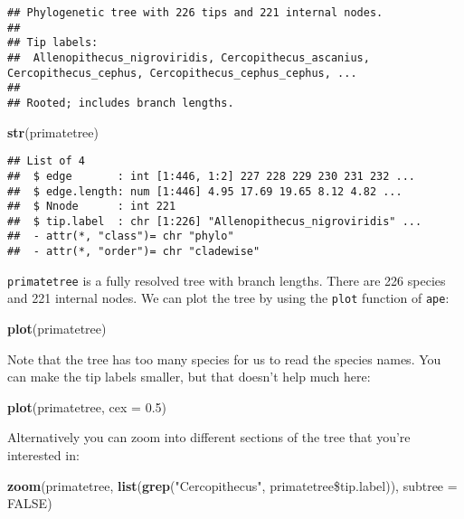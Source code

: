 \documentclass[11pt]{article}
\newcommand{\KeywordTok}[1]{\textcolor[rgb]{0.13,0.29,0.53}{\textbf{{#1}}}}
\newcommand{\DataTypeTok}[1]{\textcolor[rgb]{0.13,0.29,0.53}{{#1}}}
\newcommand{\FloatTok}[1]{\textcolor[rgb]{0.00,0.00,0.81}{{#1}}}
\newcommand{\StringTok}[1]{\textcolor[rgb]{0.31,0.60,0.02}{{#1}}}
\newcommand{\OtherTok}[1]{\textcolor[rgb]{0.56,0.35,0.01}{{#1}}}
\newcommand{\NormalTok}[1]{{#1}}
\begin{document}
\begin{verbatim}
## Phylogenetic tree with 226 tips and 221 internal nodes.
## 
## Tip labels:
##  Allenopithecus_nigroviridis, Cercopithecus_ascanius, 
Cercopithecus_cephus, Cercopithecus_cephus_cephus, ...
## 
## Rooted; includes branch lengths.
\end{verbatim}

\begin{snugshade}
\begin{Highlighting}[]
\KeywordTok{str}\NormalTok{(primatetree)}
\end{Highlighting}
\end{snugshade}

\begin{verbatim}
## List of 4
##  $ edge       : int [1:446, 1:2] 227 228 229 230 231 232 ...
##  $ edge.length: num [1:446] 4.95 17.69 19.65 8.12 4.82 ...
##  $ Nnode      : int 221
##  $ tip.label  : chr [1:226] "Allenopithecus_nigroviridis" ...
##  - attr(*, "class")= chr "phylo"
##  - attr(*, "order")= chr "cladewise"
\end{verbatim}

\texttt{primatetree} is a fully resolved tree with branch lengths. There are 226
species and 221 internal nodes. We can plot the tree by using the \texttt{plot}
function of \texttt{ape}:

\begin{snugshade}
\begin{Highlighting}[]
\KeywordTok{plot}\NormalTok{(primatetree}\NormalTok{)}
\end{Highlighting}
\end{snugshade}

Note that the tree has too many species for us to read the species names. You can make the tip labels smaller, but that doesn’t help much here:

\begin{snugshade}
\begin{Highlighting}[]
\KeywordTok{plot}\NormalTok{(primatetree, }\DataTypeTok{cex =} \FloatTok{0.5}\NormalTok{)}
\end{Highlighting}
\end{snugshade}

Alternatively you can zoom into different sections of the tree that you’re interested in:

\begin{snugshade}
\begin{Highlighting}[]
\KeywordTok{zoom}\NormalTok{(primatetree, }\KeywordTok{list}\NormalTok{(}\KeywordTok{grep}\NormalTok{(}\StringTok{"Cercopithecus"}\NormalTok{, primatetree\$tip.label)), }
      \DataTypeTok{subtree =} \OtherTok{FALSE}\NormalTok{)}
\end{Highlighting}
\end{snugshade}
\end{document}
